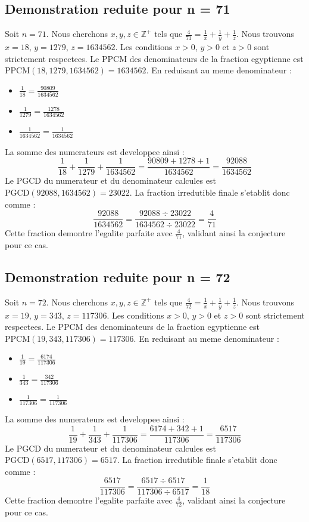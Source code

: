 \documentclass[11pt,a4paper]{article}
\begin{document}
\subsection{Demonstration reduite pour n = 71}
Soit $n = 71$. Nous cherchons $x, y, z \in \mathbb{Z}^{+}$ tels que $\frac{4}{71} = \frac{1}{x} + \frac{1}{y} + \frac{1}{z}$.
Nous trouvons $x = 18$, $y = 1279$, $z = 1634562$.
Les conditions $x > 0$, $y > 0$ et $z > 0$ sont strictement respectees.
Le PPCM des denominateurs de la fraction egyptienne est $\text{PPCM}(18, 1279, 1634562) = 1634562$.
En reduisant au meme denominateur :
\begin{itemize}
    \item $\frac{1}{18} = \frac{90809}{1634562}$
    \item $\frac{1}{1279} = \frac{1278}{1634562}$
    \item $\frac{1}{1634562} = \frac{1}{1634562}$
\end{itemize}
La somme des numerateurs est developpee ainsi :
$$ \frac{1}{18} + \frac{1}{1279} + \frac{1}{1634562} = \frac{90809 + 1278 + 1}{1634562} = \frac{92088}{1634562} $$
Le PGCD du numerateur et du denominateur calcules est $\text{PGCD}(92088, 1634562) = 23022$.
La fraction irredutible finale s'etablit donc comme :
$$ \frac{92088}{1634562} = \frac{92088 \div 23022}{1634562 \div 23022} = \frac{4}{71} $$
Cette fraction demontre l'egalite parfaite avec $\frac{4}{71}$, validant ainsi la conjecture pour ce cas.

\subsection{Demonstration reduite pour n = 72}
Soit $n = 72$. Nous cherchons $x, y, z \in \mathbb{Z}^{+}$ tels que $\frac{4}{72} = \frac{1}{x} + \frac{1}{y} + \frac{1}{z}$.
Nous trouvons $x = 19$, $y = 343$, $z = 117306$.
Les conditions $x > 0$, $y > 0$ et $z > 0$ sont strictement respectees.
Le PPCM des denominateurs de la fraction egyptienne est $\text{PPCM}(19, 343, 117306) = 117306$.
En reduisant au meme denominateur :
\begin{itemize}
    \item $\frac{1}{19} = \frac{6174}{117306}$
    \item $\frac{1}{343} = \frac{342}{117306}$
    \item $\frac{1}{117306} = \frac{1}{117306}$
\end{itemize}
La somme des numerateurs est developpee ainsi :
$$ \frac{1}{19} + \frac{1}{343} + \frac{1}{117306} = \frac{6174 + 342 + 1}{117306} = \frac{6517}{117306} $$
Le PGCD du numerateur et du denominateur calcules est $\text{PGCD}(6517, 117306) = 6517$.
La fraction irredutible finale s'etablit donc comme :
$$ \frac{6517}{117306} = \frac{6517 \div 6517}{117306 \div 6517} = \frac{1}{18} $$
Cette fraction demontre l'egalite parfaite avec $\frac{4}{72}$, validant ainsi la conjecture pour ce cas.
\end{document}
